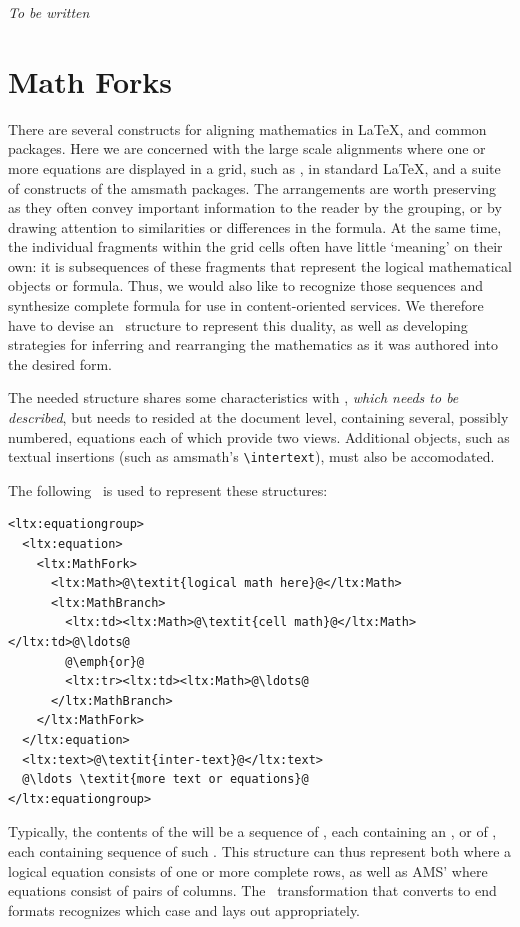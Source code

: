 \documentclass{book}
\begin{document}
\emph{To be written}

\section{Math Forks}\label{mathfork}
There are several constructs for aligning mathematics in \LaTeX, and common
packages. Here we are concerned with the large scale alignments where
one or more equations are displayed in a grid,
such as , in standard \LaTeX,
and a suite of constructs of the amsmath packages.
The arrangements are worth preserving as they often convey important information to the
reader by the grouping, or by drawing attention to similarities or differences
in the formula.   At the same time, the individual fragments within the grid
cells often have little `meaning' on their own:
it is subsequences of these fragments that represent the logical
mathematical objects or formula.  Thus, we would also like to
recognize those sequences and synthesize complete formula
for use in content-oriented services.
We therefore have to devise an \XML\ structure to represent this duality,
as well as developing strategies for inferring and rearranging
the mathematics as it was authored into the desired form.

The needed structure shares some characteristics with ,
\emph{which needs to be described},
but needs to resided at the document level, containing several,
possibly numbered, equations each of which provide two views.
Additional objects, such as textual insertions (such as amsmath's \verb|\intertext|),
must also be accomodated.

The following \XML\ is used to represent these structures:
\begin{lstlisting}[style=xml]
<ltx:equationgroup>
  <ltx:equation>
    <ltx:MathFork>
      <ltx:Math>@\textit{logical math here}@</ltx:Math>
      <ltx:MathBranch>
        <ltx:td><ltx:Math>@\textit{cell math}@</ltx:Math></ltx:td>@\ldots@
        @\emph{or}@
        <ltx:tr><ltx:td><ltx:Math>@\ldots@
      </ltx:MathBranch>
    </ltx:MathFork>
  </ltx:equation>
  <ltx:text>@\textit{inter-text}@</ltx:text>
  @\ldots \textit{more text or equations}@
</ltx:equationgroup>
\end{lstlisting}
Typically, the contents of the  will be a sequence
of , each containing an , or
of , each containing sequence of such .
This structure can thus represent both  where a logical
equation consists of one or more complete rows, as well as
AMS'  where equations consist of pairs of columns.
The \XSLT\ transformation that converts to end formats recognizes
which case and lays out appropriately.
\end{document}
